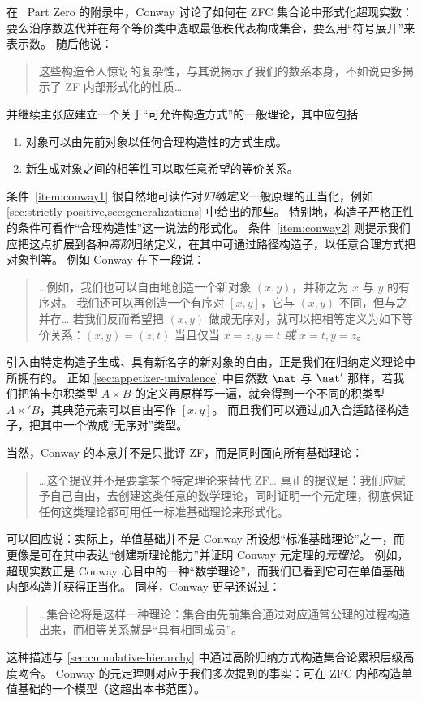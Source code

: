 %
%
在~\cite{conway:onag} Part Zero 的附录中，Conway 讨论了如何在 ZFC 集合论中形式化超现实数：要么沿序数迭代并在每个等价类中选取最低秩代表构成集合，要么用“符号展开”来表示数。
随后他说：
\begin{quote}\footnotesize
  这些构造令人惊讶的复杂性，与其说揭示了我们的数系本身，不如说更多揭示了 ZF 内部形式化的性质\dots
\end{quote}
并继续主张应建立一个关于“可允许构造方式”的一般理论，其中应包括
\begin{enumerate}\footnotesize
\item 对象可以由先前对象以任何合理构造性的方式生成。\label{item:conway1}
\item 新生成对象之间的相等性可以取任意希望的等价关系。\label{item:conway2}
\end{enumerate}
\noindent
条件~\ref{item:conway1} 很自然地可读作对\emph{归纳定义}一般原理的正当化，例如 \cref{sec:strictly-positive,sec:generalizations} 中给出的那些。
特别地，构造子严格正性的条件可看作“合理构造性”这一说法的形式化。
条件~\ref{item:conway2} 则提示我们应把这点扩展到各种\emph{高阶}归纳定义，在其中可通过路径构造子，以任意合理方式把对象判等。
例如 Conway 在下一段说：
\begin{quote}\footnotesize
  \dots 例如，我们也可以自由地创造一个新对象 $(x,y)$，并称之为 $x$ 与 $y$ 的有序对。
  我们还可以再创造一个有序对 $[x,y]$，它与 $(x,y)$ 不同，但与之并存\dots
  若我们反而希望把 $(x,y)$ 做成无序对，就可以把相等定义为如下等价关系：$(x,y)=(z,t)$ 当且仅当 $x=z,y=t$ \emph{或} $x=t,y=z$。
\end{quote}
引入由特定构造子生成、具有新名字的新对象的自由，正是我们在归纳定义理论中所拥有的。
正如 \cref{sec:appetizer-univalence} 中自然数 $\nat$ 与 $\nat'$ 那样，若我们把笛卡尔积类型 $A\times B$ 的定义再原样写一遍，就会得到一个不同的积类型 $A\times' B$，其典范元素可以自由写作 $[x,y]$。
而且我们可以通过加入合适路径构造子，把其中一个做成“无序对”类型。%

当然，Conway 的本意并不是只批评 ZF，而是同时面向所有基础理论：
\begin{quote}\footnotesize
  \dots 这个提议并不是要拿某个特定理论来替代 ZF\dots{}
  真正的提议是：我们应赋予自己自由，去创建这类任意的数学理论，同时证明一个元定理，彻底保证任何这类理论都可用任一标准基础理论来形式化。
\end{quote}
可以回应说：实际上，单值基础并不是 Conway 所设想“标准基础理论”之一，而更像是可在其中表达“创建新理论能力”并证明 Conway 元定理的\emph{元理论}。
例如，超现实数正是 Conway 心目中的一种“数学理论”，而我们已看到它可在单值基础内部构造并获得正当化。
同样，Conway 更早还说过：
\begin{quote}\footnotesize
  \dots 集合论将是这样一种理论：集合由先前集合通过对应通常公理的过程构造出来，而相等关系就是“具有相同成员”。
\end{quote}
这种描述与 \cref{sec:cumulative-hierarchy} 中通过高阶归纳方式构造集合论累积层级高度吻合。
Conway 的元定理则对应于我们多次提到的事实：可在 ZFC 内部构造单值基础的一个模型（这超出本书范围）。


